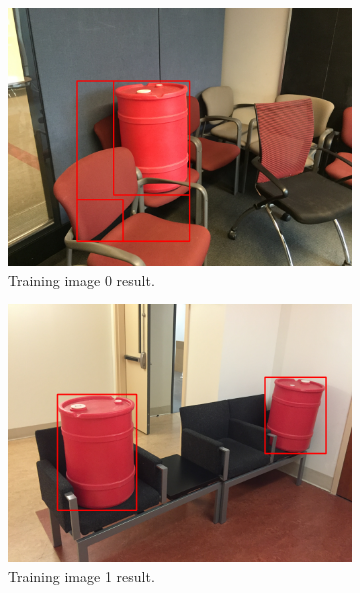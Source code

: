 \documentclass[a4paper]{article}
\begin{document}
\begin{figure}[!tbp]
  \centering
  \begin{subfigure}[b]{.4\textwidth}
    \includegraphics[width=1\textwidth]{train_image0.png}
\caption{\label{fig:train0}Training image 0 result.}
  \end{subfigure}
  \begin{subfigure}[b]{.4\textwidth}
    \includegraphics[width=1\textwidth]{train_image1.png}
\caption{\label{fig:train1}Training image 1 result.}
  \end{subfigure}
  \caption{\label{fig:train0_set}}
\end{figure}
\end{document}
